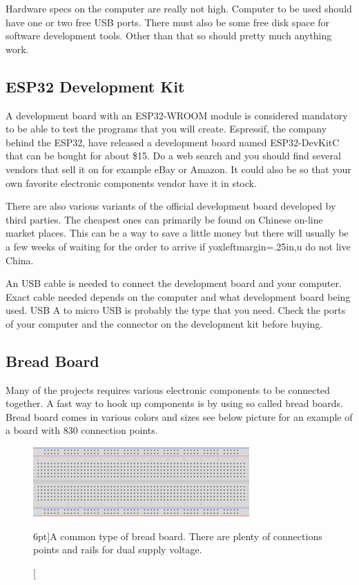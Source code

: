 \documentclass{tufte-book}
\begin{document}
	Hardware specs on the computer are really not high. Computer to be used should have one or two free USB ports. There must also be some free disk space for software development tools. Other than that so should pretty much anything work.
	
	\subsection{ESP32 Development Kit}
	A development board with an ESP32-WROOM module is considered mandatory to be able to test the programs that you will create. Espressif, the company behind the ESP32, have released a development board named ESP32-DevKitC that can be bought for about \$15. Do a web search and you should find several vendors that sell it on for example eBay or Amazon. It could also be so that your own favorite electronic components vendor have it in stock.
	
	There are also various variants of the official development board developed by third parties. The cheapest ones can primarily be found on Chinese on-line market places. This can be a way to save a little money but there will usually be a few weeks of waiting for the order to arrive if yoxleftmargin=.25in,u do not live China.
	
	An USB cable is needed to connect the development board and your computer. Exact cable needed depends on the computer and what development board being used. USB A to micro USB is probably the type that you need. Check the ports of your computer and the connector on the development kit before buying.
	
	\subsection{Bread Board}
	Many of the projects requires various electronic components to be connected together. A fast way to hook up components is by using so called bread boards. Bread board comes in various colors and sizes see below picture for an example of a board with 830 connection points.
	
	\begin{figure}
		\includegraphics{bread_board.png}
		\caption[Bread board $n$.][6pt]{A common type of bread board. There are plenty of connections points and rails for dual supply voltage.}
		\label{fig:bread_board}
	\end{figure}
	
\end{document}

